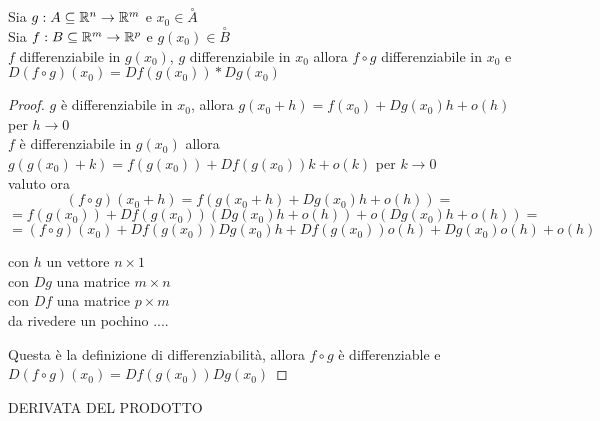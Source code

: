 \proposition
Sia $g: A\subseteq \mathbb{R}^n \rightarrow \mathbb{R}^m$ e $x_0\in\overset{\circ}{A}$\\
Sia $f: B\subseteq \mathbb{R}^m \rightarrow \mathbb{R}^p$ e $g(x_0)\in\overset{\circ}{B}$\\
$f$ differenziabile in $g(x_0)$, $g$ differenziabile in $x_0$ allora $f\circ g$ differenziabile in $x_0$ e $D(f\circ g)(x_0) = Df(g(x_0))*Dg(x_0)$
\begin{proof}
	$g$ è differenziabile in $x_0$, allora $g(x_0+h)=f(x_0)+Dg(x_0)h+o(h)$ per $h\rightarrow 0$\\
	$f$ è differenziabile in $g(x_0)$ allora $g(g(x_0)+k)=f(g(x_0))+Df(g(x_0))k+o(k)$ per $k\rightarrow 0$\\
	valuto ora 
	$$(f\circ g)(x_0+h) = f(g(x_0+h)+Dg(x_0)h+o(h)) = $$ 
	$$=f(g(x_0))+Df(g(x_0))(Dg(x_0)h+o(h))+o(Dg(x_0)h+o(h)) = $$
	$$=(f\circ g)(x_0) + Df(g(x_0))Dg(x_0)h+Df(g(x_0))o(h)+Dg(x_0)o(h)+o(h)$$
	
	con $h$ un vettore $n\times 1$\\
	con $Dg$ una matrice $m\times n$\\
	con $Df$ una matrice $p\times m$\\
	
	da rivedere un pochino ....
	
	Questa è la definizione di differenziabilità, allora $f\circ g$ è differenziable e $D(f\circ g)(x_0) = Df(g(x_0))Dg(x_0)$
\end{proof}
\proposition DERIVATA DEL PRODOTTO

